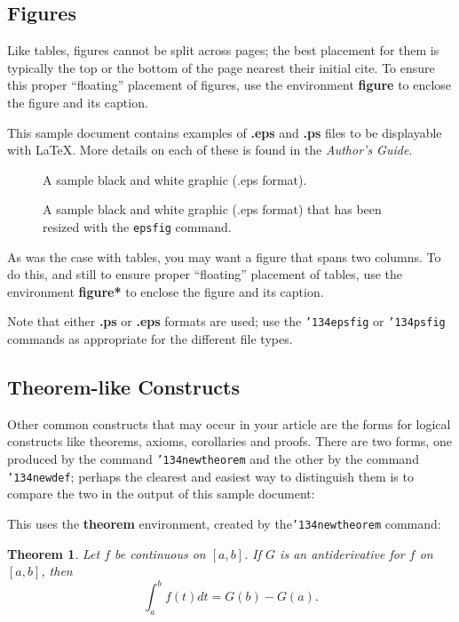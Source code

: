 \documentclass{acm_proc_article-sp}
\begin{document}
\subsection{Figures}
Like tables, figures cannot be split across pages; the
best placement for them
is typically the top or the bottom of the page nearest
their initial cite.  To ensure this proper ``floating'' placement
of figures, use the environment
\textbf{figure} to enclose the figure and its caption.

This sample document contains examples of \textbf{.eps}
and \textbf{.ps} files to be displayable with \LaTeX.  More
details on each of these is found in the \textit{Author's Guide}.

\begin{figure}
\centering
\caption{A sample black and white graphic (.eps format).}
\end{figure}

\begin{figure}
\centering
\caption{A sample black and white graphic (.eps format)
that has been resized with the \texttt{epsfig} command.}
\end{figure}


As was the case with tables, you may want a figure
that spans two columns.  To do this, and still to
ensure proper ``floating'' placement of tables, use the environment
\textbf{figure*} to enclose the figure and its caption.

Note that either {\textbf{.ps}} or {\textbf{.eps}} formats are
used; use
the \texttt{{\char'134}epsfig} or \texttt{{\char'134}psfig}
commands as appropriate for the different file types.

\subsection{Theorem-like Constructs}
Other common constructs that may occur in your article are
the forms for logical constructs like theorems, axioms,
corollaries and proofs.  There are
two forms, one produced by the
command \texttt{{\char'134}newtheorem} and the
other by the command \texttt{{\char'134}newdef}; perhaps
the clearest and easiest way to distinguish them is
to compare the two in the output of this sample document:

This uses the \textbf{theorem} environment, created by
the\linebreak\texttt{{\char'134}newtheorem} command:
\newtheorem{theorem}{Theorem}
\begin{theorem}
Let $f$ be continuous on $[a,b]$.  If $G$ is
an antiderivative for $f$ on $[a,b]$, then
\begin{displaymath}\int^b_af(t)dt = G(b) - G(a).\end{displaymath}
\end{theorem}
\end{document}
